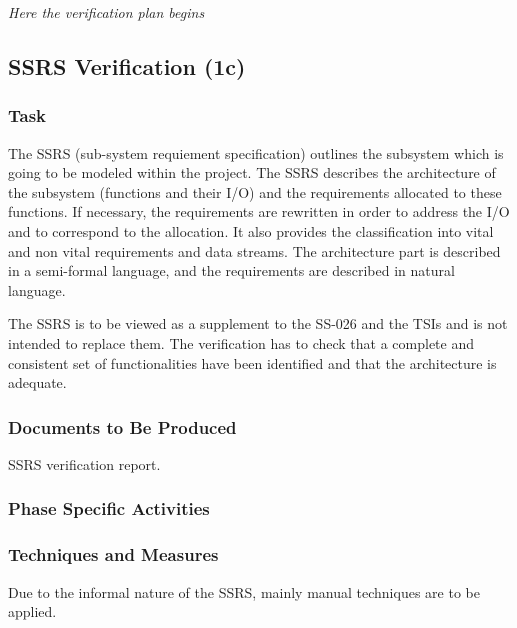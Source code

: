 \documentclass{template/openetcs_report}
\begin{document}
\textit{Here the verification plan begins}

\subsection{SSRS Verification (1c)}
\label{sec:ssrs-verification}

\subsubsection{Task}
\label{sec:ssrs-verif-task}

The SSRS (sub-system requiement specification) outlines the subsystem
which is going to be modeled within the project. The SSRS describes
the architecture of the subsystem (functions and their I/O) and the
requirements allocated to these functions. If necessary, the
requirements are rewritten in order to address the I/O and to
correspond to the allocation. It also provides the classification into
vital and non vital requirements and data
streams. The architecture part is described in a semi-formal language,
and the requirements are described in natural language.

The SSRS is to be viewed as a supplement to the SS-026 and the
TSIs and is not intended to replace them. The verification has to
check that a complete and consistent set of functionalities have been
identified and that the architecture is adequate. 



\subsubsection{Documents to Be Produced}
\label{sec:ssrs-verif-docum-be-prod}

SSRS verification report.

\subsubsection{Phase Specific Activities}
\label{sec:ssrs-verif-phase-spec-activ}

\subsubsection{Techniques and Measures}
\label{sec:ssrs-verif-techniques-measures}

 Due to the informal
nature of the SSRS, mainly manual techniques are to be applied.
\end{document}

